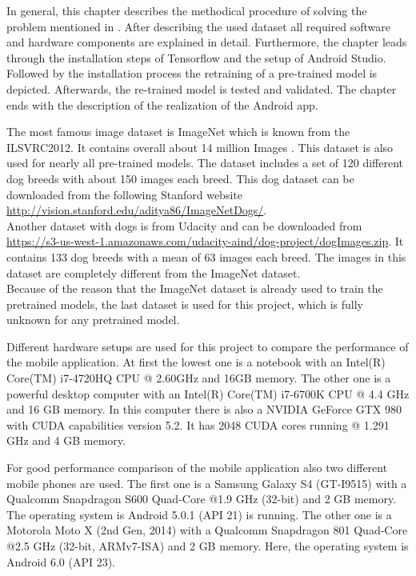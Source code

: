 In general, this chapter describes the methodical procedure of solving the problem mentioned in . After describing the used dataset all required software and hardware components are explained in detail. Furthermore, the chapter leads through the installation steps of Tensorflow and the setup of Android Studio. Followed by the installation process the retraining of a pre-trained model is depicted. Afterwards, the re-trained model is tested and validated. The chapter ends with the description of the realization of the Android app.

The most famous image dataset is ImageNet which is known from the ILSVRC2012. It contains overall about 14 million Images \citep{ImageNet2010}. This dataset is also used for nearly all pre-trained models. The dataset includes a set of 120 different dog breeds with about 150 images each breed. This dog dataset can be downloaded from the following Stanford website \url{http://vision.stanford.edu/aditya86/ImageNetDogs/}. \\
Another dataset with dogs is from Udacity and can be downloaded from \url{https://s3-us-west-1.amazonaws.com/udacity-aind/dog-project/dogImages.zip}. It contains 133 dog breeds with a mean of 63 images each breed. The images in this dataset are completely different from the ImageNet dataset. \\

Because of the reason that the ImageNet dataset is already used to train the pretrained models, the last dataset is used for this project, which is fully unknown for any pretrained model.

Different hardware setups are used for this project to compare the performance of the mobile application.
At first the lowest one is a notebook with an Intel(R) Core(TM) i7-4720HQ CPU @ 2.60GHz and 16GB memory.
The other one is a powerful desktop computer with an Intel(R) Core(TM) i7-6700K CPU @ 4.4 GHz and 16 GB memory.
In this computer there is also a NVIDIA GeForce GTX 980 with CUDA capabilities version 5.2. It has 2048 CUDA cores running @ 1.291 GHz and 4 GB memory.

For good performance comparison of the mobile application also two different mobile phones are used. The first one is a Samsung Galaxy S4 (GT-I9515) with a Qualcomm Snapdragon S600 Quad-Core @1.9 GHz (32-bit) and 2 GB memory. The operating system is Android 5.0.1 (API 21) is running.
The other one is a Motorola Moto X (2nd Gen, 2014) with a Qualcomm Snapdragon 801 Quad-Core @2.5 GHz (32-bit, ARMv7-ISA) and 2 GB memory. Here, the operating system is Android 6.0 (API 23).

